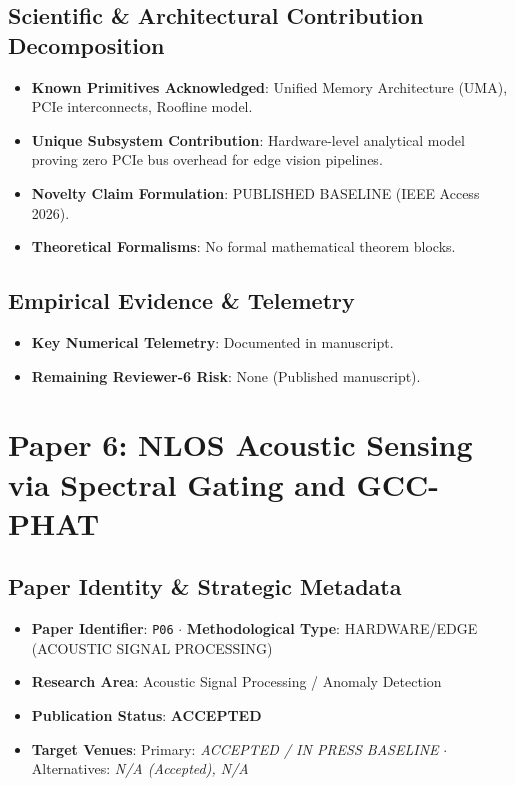 \documentclass[11pt,a4paper]{article}
\begin{document}
\subsection*{Scientific & Architectural Contribution Decomposition}
\begin{itemize}[leftmargin=1.5em, itemsep=0.2em]
    \item \textbf{Known Primitives Acknowledged}: Unified Memory Architecture (UMA), PCIe interconnects, Roofline model.
    \item \textbf{Unique Subsystem Contribution}: Hardware-level analytical model proving zero PCIe bus overhead for edge vision pipelines.
    \item \textbf{Novelty Claim Formulation}: PUBLISHED BASELINE (IEEE Access 2026).
    \item \textbf{Theoretical Formalisms}: No formal mathematical theorem blocks.
\end{itemize}

\subsection*{Empirical Evidence & Telemetry}
\begin{itemize}[leftmargin=1.5em, itemsep=0.2em]
    \item \textbf{Key Numerical Telemetry}: Documented in manuscript.
    \item \textbf{Remaining Reviewer-6 Risk}: None (Published manuscript).
\end{itemize}

\section{Paper 6: NLOS Acoustic Sensing via Spectral Gating and GCC-PHAT}

\subsection*{Paper Identity \& Strategic Metadata}
\begin{itemize}[leftmargin=1.5em, itemsep=0.2em]
    \item \textbf{Paper Identifier}: \texttt{P06} $\cdot$ \textbf{Methodological Type}: HARDWARE/EDGE (ACOUSTIC SIGNAL PROCESSING)
    \item \textbf{Research Area}: Acoustic Signal Processing / Anomaly Detection
    \item \textbf{Publication Status}: \textbf{ACCEPTED}
    \item \textbf{Target Venues}: Primary: \textit{ACCEPTED / IN PRESS BASELINE} $\cdot$ Alternatives: \textit{N/A (Accepted), N/A}
\end{itemize}
\end{document}
